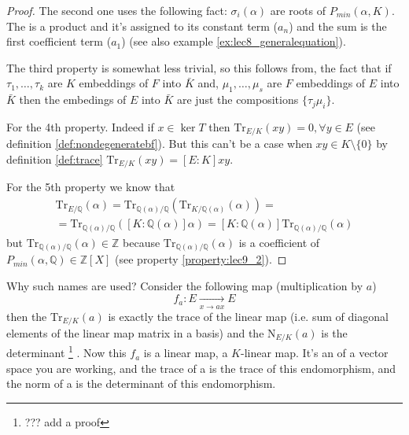 \begin{property}
\begin{proof}
    The second one uses the following fact:
    $\sigma_i\left(\alpha\right)$ are roots of $P_{min}\left(\alpha,
    K\right)$. The  is a product and it's assigned
    to its constant term ($a_n$) and the sum is the first coefficient 
    term ($a_1$) (see also example \ref{ex:lec8_generalequation}).

    The third property is somewhat less trivial, so this follows from,
    the fact that if $\tau_1, \dots, \tau_k$ are $K$ embeddings of $F$
    into $\bar{K}$ and, $\mu_1, \dots, \mu_s$ are $F$ embeddings of
    $E$ into $\bar{K}$ then the embedings of $E$ into $\bar{K}$ are
    just the compositions $\{\tau_j \mu_i\}$.

    For the 4th property. Indeed if $x \in \ker T$ then
    $\mathrm{Tr}_{E/K}\left(xy\right) = 0, \forall y \in E$ (see
    definition \ref{def:nondegeneratebf}). But this
    can't be a case when $xy \in K \setminus \{0\}$ by definition
    \ref{def:trace} $\mathrm{Tr}_{E/K}\left(xy\right) =
    \left[E:K\right] xy$.

    For the 5th property we know that
    \begin{eqnarray}
    \mathrm{Tr}_{E/\mathbb{Q}}\left(\alpha\right) =
    \mathrm{Tr}_{\mathbb{Q}(\alpha)/\mathbb{Q}}\left(
    \mathrm{Tr}_{K/\mathbb{Q}(\alpha)}\left(\alpha\right)
    \right) =
    \nonumber \\
    =
    \mathrm{Tr}_{\mathbb{Q}(\alpha)/\mathbb{Q}}\left(
    \left[K:\mathbb{Q}(\alpha)\right] \alpha
    \right) =
    \left[K:\mathbb{Q}(\alpha)\right]
    \mathrm{Tr}_{\mathbb{Q}(\alpha)/\mathbb{Q}}\left(
     \alpha
    \right)
    \nonumber
    \end{eqnarray}
    but
    \(
    \mathrm{Tr}_{\mathbb{Q}(\alpha)/\mathbb{Q}}\left(
    \alpha
    \right) \in \mathbb{Z}
    \)
    because
    \(
    \mathrm{Tr}_{\mathbb{Q}(\alpha)/\mathbb{Q}}\left(
    \alpha
    \right)
    \) is a coefficient of $P_{min}\left(\alpha, \mathbb{Q}\right) \in
    \mathbb{Z}\left[X\right]$ (see property \ref{property:lec9_2}).     
  \end{proof}
  \label{property:lec9_norm_trace}
\end{property}

Why such names are used? Consider the following map
(multiplication by $a$)
\[
f_a: E \xrightarrow[x \to a x]{} E
\]
then the $\mathrm{Tr}_{E/K}\left(a\right)$ is exactly the trace of the
linear map (i.e. sum of diagonal elements of the linear map matrix in
a basis) and the $\mathrm{N}_{E/K}\left(a\right)$ is the
determinant
\footnote{
  ??? add a proof
}
. Now this $f_a$ is a linear map, a $K$-linear map. It's an
 of a vector space you are working, and the trace of a is
the trace of this endomorphism, and the norm of a is the determinant
of this endomorphism.  


